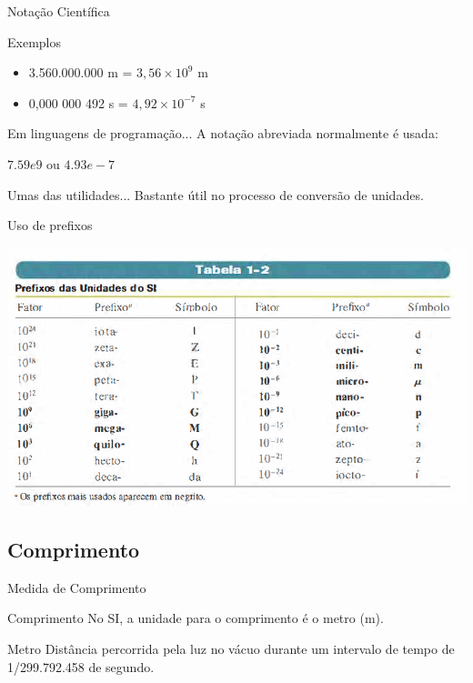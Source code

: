 \documentclass[xcolor=dvipsnames,table]{beamer}
\begin{document}
	\begin{frame}{Notação Científica}
		\begin{block}{Exemplos}
			\begin{itemize}
				\item 3.560.000.000 m = $3,56 \times 10^9$ m \pause
				\item 0,000 000 492 s = $4,92 \times 10^{-7}$ s
			\end{itemize}
		\end{block} \pause
		\begin{block}{Em linguagens de programação...}
			A notação abreviada normalmente é usada: \pause
			\begin{center}
				$7.59 e9$ ou $4.93 e-7$
			\end{center}
		\end{block} \pause
		\begin{block}{Umas das utilidades...}
			Bastante útil no processo de conversão de unidades.
		\end{block}
	\end{frame}
	
	\begin{frame}{Uso de prefixos}
		\begin{center}
			\includegraphics[scale=0.5]{images/tabela1-2.png}
		\end{center}
	\end{frame}
	
	\subsection{Comprimento}
	\begin{frame}{Medida de Comprimento}
		\begin{block}{Comprimento}
			No SI, a unidade para o comprimento é o metro (m).
		\end{block} \pause
		\begin{block}{Metro}
			Distância percorrida pela luz no vácuo durante um intervalo de tempo de 1/299.792.458 de segundo.
		\end{block}
	\end{frame}
	
\end{document}
